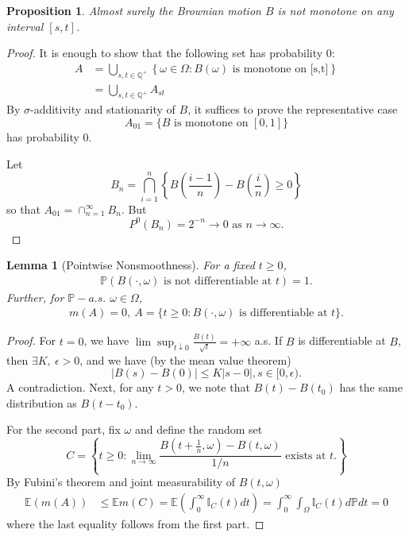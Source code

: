 \documentclass{article}
\theoremstyle{plain}
\newtheorem{lemma}{Lemma}
\newtheorem{proposition}{Proposition}
\theoremstyle{definition}
\begin{document}
\begin{proposition}
Almost surely the Brownian motion $B$ is not monotone on any interval $[s,t]$.
\end{proposition}

\begin{proof}
It is enough to show that the following set has probability $0$:
\begin{align*}
    A &= \bigcup_{s,t\in \mathbb{Q^+}}\left\{ \omega\in\Omega:B(\omega)\text{ is monotone on [s,t]} \right\}\\
    &= \bigcup_{s,t\in \mathbb{Q^+}}A_{st}
\end{align*}
By \(\sigma\)-additivity and stationarity of \(B\), it suffices to prove the representative case
\[
A_{01}=\{B\text{ is monotone on }[0,1]\}
\]
has probability \(0\).

Let 
\[
B_n = \bigcap_{i=1}^n\left\{ B\left(\frac{i-1}{n}\right)-B\left(\frac{i}{n}\right)\ge 0 \right\}
\]
so that $A_{01} = \cap_{n=1}^\infty B_n$. But
\[
P^0(B_n) = 2^{-n} \rightarrow 0 \text{ as }n\rightarrow\infty.
\]
\end{proof}

\begin{lemma}[Pointwise Nonsmoothness] 
For a fixed $t\ge 0$, 
\begin{align}
    \mathbb{P}(B(\cdot,\omega)\text{ is not differentiable at }t) = 1.       
\end{align}
Further, for $\mathbb{P}-a.s.$ $\omega\in\Omega$,
\begin{align}
    m(A) = 0,\ A = \{t\ge0:B(\cdot,\omega)\text{ is differentiable at }t\}.
\end{align}
\end{lemma}

\begin{proof}
For $t = 0$, we have $\lim\sup_{t\downarrow0}\frac{B(t)}{\sqrt{t}} = +\infty$ a.s. If $B$ is differentiable at $B$, then $\exists K,\ \epsilon>0$, and we have (by the mean value theorem)
\[
|B(s)-B(0)| \le K |s-0|, s\in[0,\epsilon).
\]
A contradiction. Next, for any $t>0$, we note that $B(t)-B(t_0)$ has the same distribution as $B(t-t_0)$.  

For the second part, fix $\omega$ and define the random set
\[
C = \left\{t\ge0 : \lim_{n\rightarrow\infty}\frac{B(t+\frac{1}{n},\omega)-B(t,\omega)}{1/n}\text{ exists at $t$.}\right\}
\]
By Fubini's theorem and joint measurability of $B(t,\omega)$
\begin{align}
    \mathbb{E}\left(m(A)\right) &\le \mathbb{E}m(C) = \mathbb{E}\left(\int_0^\infty\mathbb{I}_C(t)dt\right) = \int_0^\infty\int_\Omega\mathbb{I}_C(t)d\mathbb{P}dt = 0
\end{align}
where the last equality follows from the first part.
\end{proof}
\end{document}
